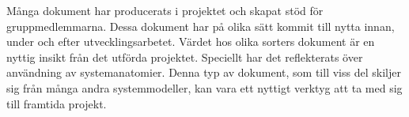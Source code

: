 Många dokument har producerats i projektet och skapat stöd för gruppmedlemmarna. Dessa dokument har på olika sätt kommit till nytta innan, under och efter utvecklingsarbetet. Värdet hos olika sorters dokument är en nyttig insikt från det utförda projektet. Speciellt har det reflekterats över användning av systemanatomier. Denna typ av dokument, som till viss del skiljer sig från många andra systemmodeller, kan vara ett nyttigt verktyg att ta med sig till framtida projekt.

%
